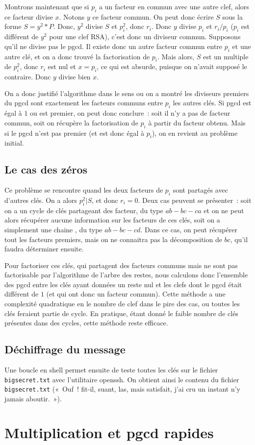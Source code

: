 \documentclass[a4paper,10pt]{article}
\begin{document}
  Montrons maintenant que si $p_i$ a un facteur en commun avec une autre clef, alors ce facteur divise $x$. Notons $y$ ce facteur commun. On peut donc écrire $S$ sous la forme $S = y^2*P$. Donc, $y^2$ divise $S$ et $p_i^2$, donc $r_i$.
  Donc $y$ divise $p_i$ et $r_i/p_i$ ($p_i$ est différent de $y^2$ pour une clef RSA), c'est donc un diviseur commun.
  Supposons qu'il ne divise pas le pgcd. Il existe donc un autre facteur commun entre $p_i$ et une autre clé, et on a donc trouvé la factorisation de $p_i$. Mais alors, $S$ est un multiple de $p_i^2$, donc $r_i$ est nul et $x = p_i$, ce qui est absurde, puisque on n'avait supposé le contraire. Donc $y$ divise bien $x$.
  
  On a donc justifié l'algorithme dans le sens ou on a montré les diviseurs premiers du pgcd sont exactement les facteurs communs entre $p_i$ les autres clés. Si pgcd est égal à $1$ ou est premier, on peut donc conclure~: soit il n'y a pas de facteur commun, soit on récupère la factorisation de $p_i$ à partir du facteur obtenu. Mais si le pgcd n'est pas premier (et est donc égal à $p_i$), on en revient au problème initial.
  
   \subsection{Le \og{}cas des zéros\fg}
  
   Ce problème se rencontre quand les deux facteurs de $p_i$ sont partagés avec d'autres clés. On a alors $p_i^2 | S$, et donc $r_i = 0$. Deux cas peuvent se présenter~: soit on a un \og{} cycle \fg{} de clés partageant des facteur, du type $ab - bc - ca$ et on ne peut alors récupérer aucune information sur les facteurs de ces clés, soit on a simplement une \og{} chaine \fg, du type $ab - bc - cd$. Dans ce cas, on peut récupérer tout les facteurs premiers, mais on ne connaitra pas la décomposition de $bc$, qu'il faudra déterminer ensuite.
  
  Pour factoriser ces clés, qui partagent des facteurs communs mais ne sont pas factorisable par l'algorithme de l'arbre des restes, nous calculons donc l'ensemble des pgcd entre les clés ayant données un reste nul et les clefs dont le pgcd était différent de $1$ (et qui ont donc un facteur commun). Cette méthode a une complexité quadratique en le nombre de clef dans le pire des cas, ou toutes les clés feraient partie de cycle. En pratique, étant donné le faible nombre de clés présentes dans des cycles, cette méthode reste efficace.
  
  \subsection{Déchiffrage du message}
  Une boucle en shell permet ensuite de teste toutes les clés sur le fichier \texttt{bigsecret.txt} avec l'utilitaire openssh. On obtient ainsi le contenu du fichier \texttt{bigsecret.txt} («~Ouf~! fit-il, suant, las, mais satisfait, j'ai cru un instant n'y jamais aboutir.~»).

\section{Multiplication et pgcd rapides}
\end{document}
